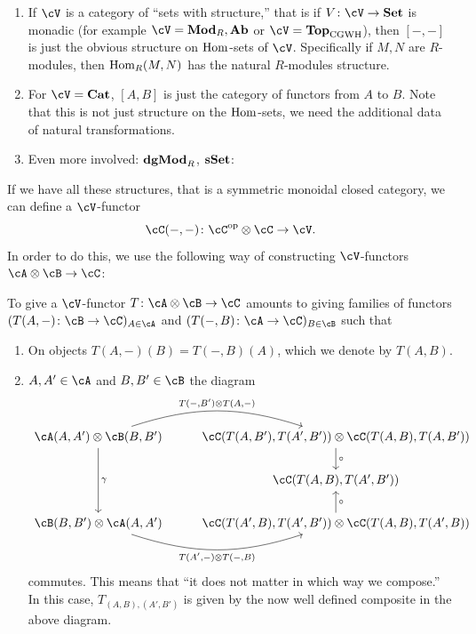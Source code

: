 \documentclass[a4paper,11pt,oneside,openany]{scrbook}
\begin{document}
\begin{exmp}
	\begin{enumerate}[label=\arabic*)]
		\item
		      If $ \cV $ is a category of ``sets with structure,'' that is if $
              V \from \cV \to \Set $ is monadic (for example $ \cV = \Mod_R,\Ab
              $ or $ \cV = \Top_{\mathrm{CGWH}} $), then $ [-,-] $ is just the
              obvious structure on $\operatorname{\text{Hom}}$-sets of $\cV$. Specifically if $ M,N $
              are $ R $-modules, then $\operatorname{\text{Hom}}_R(M,N)$ has the natural $ R
              $-modules structure.
		\item For $\cV=\Cat$, $[A,B]$ is just the category of functors from $A$
            to $B$. Note that this is not just structure on the $\operatorname{\text{Hom}}$-sets, we
            need the additional data of natural transformations.
		\item Even more involved: ${\normalfont\textbf{dgMod}}_R$, ${\normalfont\textbf{sSet}}$:
	\end{enumerate}
\end{exmp}
If we have all these structures, that is a symmetric monoidal closed category,
we can define a $\cV$-functor
\begin{displaymath}
	\cC(-,-)\from\cC^{\op}\otimes\cC\to\cV.
\end{displaymath}
In order to do this, we use the following way of constructing $\cV$-functors
$\cA\otimes\cB\to\cC$:
\begin{prop}
	To give a $\cV$-functor $T\from\cA\otimes\cB\to\cC$ amounts to
    giving families of functors $(T(A,-)\from\cB\to\cC)_{A\in\cA}$ and
    $(T(-,B)\from\cA\to\cC)_{B\in\cB}$ such that
	\begin{enumerate}[label=\roman*)]
		\item On objects $T(A,-)(B)=T(-,B)(A)$, which we denote by $T(A,B)$.
        \item $A,A'\in\cA$ and $B,B'\in\cB$ the diagram
		      \begin{displaymath}
			      \begin{tikzcd}%
				      \cA(A,A')\otimes \cB(B,B')
				      \arrow[r, "{T(-,B')\otimes T(A,-)}", bend left=18]
				      \arrow[dd, "\gamma"]
				      &
				      \cC(T(A,B') ,T(A',B')) \otimes \cC(T(A,B) ,T(A,B'))
				      \arrow[d, "\circ"]
				      \\
				      & \cC(T(A,B),T(A',B'))
				      \\
				      \cB(B,B') \otimes \cA(A,A')
				      \arrow[r, "{T(A',-)\otimes T(-,B)}"', bend right=18]
				      & \cC(T(A',B) ,T(A',B')) \otimes \cC(T(A,B) ,T(A',B))
				      \arrow[u, "\circ"']
			      \end{tikzcd}
		      \end{displaymath}
		      commutes.
		      This means that ``it does not matter in which way we compose.''
		      In this case, $ T_{(A,B),(A',B')}  $ is given by the now well defined composite in the above diagram.
	\end{enumerate}
\end{prop}
\end{document}

